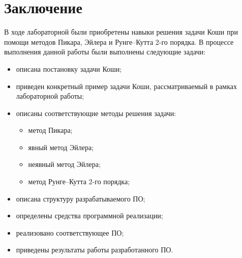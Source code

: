 \chapter*{Заключение}

В ходе лабораторной  были приобретены навыки решения задачи Коши при помощи методов Пикара, Эйлера и Рунге--Кутта 2-го порядка. В процессе выполнения данной работы были выполнены следующие задачи:

\begin{itemize}
    \item описана постановку задачи Коши;
    \item приведен конкретный пример задачи Коши, рассматриваемый в рамках лабораторной работы;
    \item описаны соответствующие методы решения задачи:
        \begin{itemize}
            \item метод Пикара;
            \item явный метод Эйлера;
            \item неявный метод Эйлера;
            \item метод Рунге--Кутта 2-го порядка;
        \end{itemize}
	\item описана структуру разрабатываемого ПО;
	\item определены средства программной реализации;
    \item реализовано соответствующее ПО;
	\item приведены результаты работы разработанного ПО.
\end{itemize}
